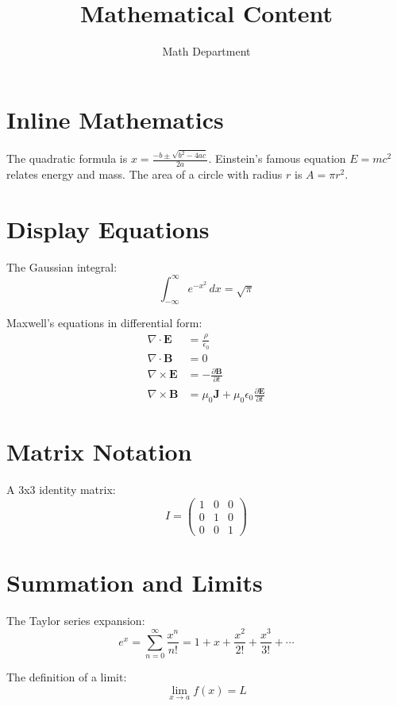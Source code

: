 \documentclass[12pt]{article}
\title{Mathematical Content}
\author{Math Department}
\begin{document}
\maketitle

\section{Inline Mathematics}
The quadratic formula is $x = \frac{-b \pm \sqrt{b^2 - 4ac}}{2a}$. Einstein's
famous equation $E = mc^2$ relates energy and mass. The area of a circle with
radius $r$ is $A = \pi r^2$.

\section{Display Equations}
The Gaussian integral:
\begin{equation}
\int_{-\infty}^{\infty} e^{-x^2} \, dx = \sqrt{\pi}
\end{equation}

Maxwell's equations in differential form:
\begin{align}
\nabla \cdot \mathbf{E} &= \frac{\rho}{\epsilon_0} \\
\nabla \cdot \mathbf{B} &= 0 \\
\nabla \times \mathbf{E} &= -\frac{\partial \mathbf{B}}{\partial t} \\
\nabla \times \mathbf{B} &= \mu_0 \mathbf{J} + \mu_0 \epsilon_0 \frac{\partial \mathbf{E}}{\partial t}
\end{align}

\section{Matrix Notation}
A 3x3 identity matrix:
\begin{equation}
I = \begin{pmatrix}
1 & 0 & 0 \\
0 & 1 & 0 \\
0 & 0 & 1
\end{pmatrix}
\end{equation}

\section{Summation and Limits}
The Taylor series expansion:
\begin{equation}
e^x = \sum_{n=0}^{\infty} \frac{x^n}{n!} = 1 + x + \frac{x^2}{2!} + \frac{x^3}{3!} + \cdots
\end{equation}

The definition of a limit:
\begin{equation}
\lim_{x \to a} f(x) = L
\end{equation}
\end{document}
